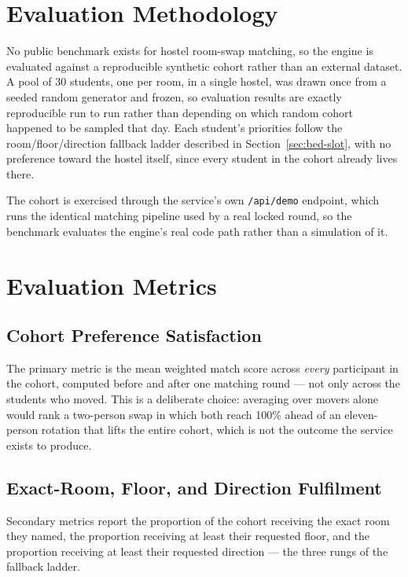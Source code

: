\documentclass[11pt,a4paper]{report}
\begin{document}
\section{Evaluation Methodology}
\label{sec:eval-methodology}

No public benchmark exists for hostel room-swap matching, so the
engine is evaluated against a reproducible synthetic cohort rather
than an external dataset. A pool of 30 students, one per room, in a
single hostel, was drawn once from a seeded random generator and
frozen, so evaluation results are exactly reproducible run to run
rather than depending on which random cohort happened to be sampled
that day. Each student's priorities follow the room/floor/direction
fallback ladder described in Section~\ref{sec:bed-slot}, with no
preference toward the hostel itself, since every student in the
cohort already lives there.

The cohort is exercised through the service's own \texttt{/api/demo}
endpoint, which runs the identical matching pipeline used by a real
locked round, so the benchmark evaluates the engine's real code path
rather than a simulation of it.

\section{Evaluation Metrics}

\subsection{Cohort Preference Satisfaction}

The primary metric is the mean weighted match score across
\emph{every} participant in the cohort, computed before and after one
matching round --- not only across the students who moved. This is a
deliberate choice: averaging over movers alone would rank a two-person
swap in which both reach 100\% ahead of an eleven-person rotation that
lifts the entire cohort, which is not the outcome the service exists
to produce.

\subsection{Exact-Room, Floor, and Direction Fulfilment}

Secondary metrics report the proportion of the cohort receiving the
exact room they named, the proportion receiving at least their
requested floor, and the proportion receiving at least their requested
direction --- the three rungs of the fallback ladder.
\end{document}
